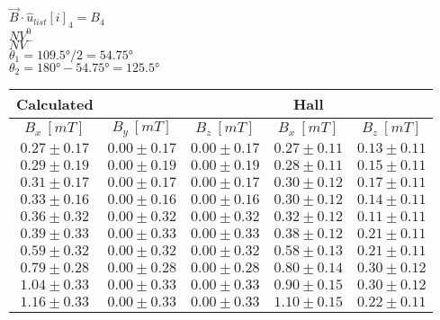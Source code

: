 \documentclass{report}
\begin{document}
    $\vec{B} \cdot \hat{u}_{list}[i]_4 = B_4$ \\
    $NV^0$\\
    $NV^-$\\
    $\theta_1 = \ang{109.5} / 2 = \ang{54.75}$\\
    $\theta_2 = \ang{180} - \ang{54.75} = \ang{125.5}$\\
\begin{center}
  \begin{tabular}{|c|c|c||c|c|} \hline
    Calculated & & & Hall &\\ \hline
    $B_x \ [mT]$ & $B_y \ [mT]$ & $B_z \ [mT]$ & $B_x \ [mT]$ & $B_z \ [mT]$ \\ \hline
    $ 0.27 \pm 0.17 $ & $ 0.00 \pm 0.17 $ & $ 0.00 \pm 0.17 $ & $ 0.27 \pm 0.11 $ & $ 0.13 \pm 0.11 $ \\ \hline
    $ 0.29 \pm 0.19 $ & $ 0.00 \pm 0.19 $ & $ 0.00 \pm 0.19 $ & $ 0.28 \pm 0.11 $ & $ 0.15 \pm 0.11 $ \\ \hline
    $ 0.31 \pm 0.17 $ & $ 0.00 \pm 0.17 $ & $ 0.00 \pm 0.17 $ & $ 0.30 \pm 0.12 $ & $ 0.17 \pm 0.11 $ \\ \hline
    $ 0.33 \pm 0.16 $ & $ 0.00 \pm 0.16 $ & $ 0.00 \pm 0.16 $ & $ 0.30 \pm 0.12 $ & $ 0.14 \pm 0.11 $ \\ \hline
    $ 0.36 \pm 0.32 $ & $ 0.00 \pm 0.32 $ & $ 0.00 \pm 0.32 $ & $ 0.32 \pm 0.12 $ & $ 0.11 \pm 0.11 $ \\ \hline
    $ 0.39 \pm 0.33 $ & $ 0.00 \pm 0.33 $ & $ 0.00 \pm 0.33 $ & $ 0.38 \pm 0.12 $ & $ 0.21 \pm 0.11 $ \\ \hline
    $ 0.59 \pm 0.32 $ & $ 0.00 \pm 0.32 $ & $ 0.00 \pm 0.32 $ & $ 0.58 \pm 0.13 $ & $ 0.21 \pm 0.11 $ \\ \hline
    $ 0.79 \pm 0.28 $ & $ 0.00 \pm 0.28 $ & $ 0.00 \pm 0.28 $ & $ 0.80 \pm 0.14 $ & $ 0.30 \pm 0.12 $ \\ \hline
    $ 1.04 \pm 0.33 $ & $ 0.00 \pm 0.33 $ & $ 0.00 \pm 0.33 $ & $ 0.90 \pm 0.15 $ & $ 0.30 \pm 0.12 $ \\ \hline
    $ 1.16 \pm 0.33 $ & $ 0.00 \pm 0.33 $ & $ 0.00 \pm 0.33 $ & $ 1.10 \pm 0.15 $ & $ 0.22 \pm 0.11 $ \\ \hline
  \end{tabular}
\end{center}
\end{document}
